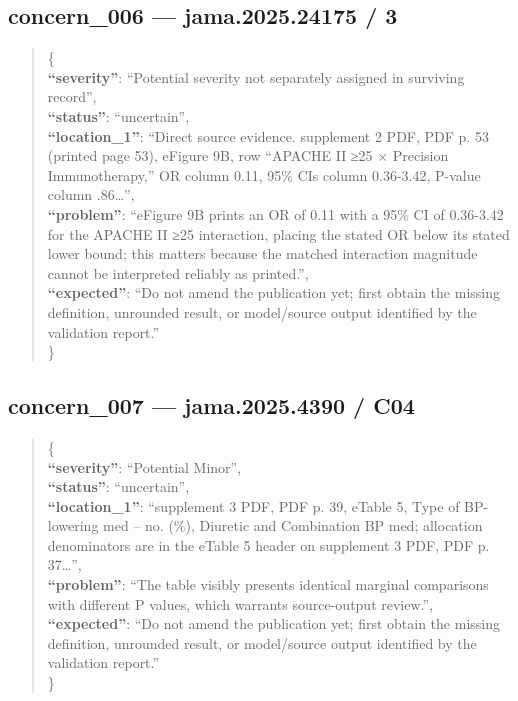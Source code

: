 \documentclass[
  letterpaper,
  9pt]{extreport}
\begin{document}
\hypertarget{concern_006--jama202524175--3}{%
\subsection{concern\_006 --- jama.2025.24175 /
3}\label{concern_006--jama202524175--3}}

\begin{quote}
\{\\
\textbf{``severity''}: ``Potential severity not separately assigned in
surviving record'',\\
\textbf{``status''}: ``uncertain'',\\
\textbf{``location\_1''}: ``Direct source evidence. supplement 2 PDF,
PDF p. 53 (printed page 53), eFigure 9B, row ``APACHE II ≥25 × Precision
Immunotherapy,'' OR column 0.11, 95\% CIs column 0.36-3.42, P-value
column .86\ldots{}'',\\
\textbf{``problem''}: ``eFigure 9B prints an OR of 0.11 with a 95\% CI
of 0.36-3.42 for the APACHE II ≥25 interaction, placing the stated OR
below its stated lower bound; this matters because the matched
interaction magnitude cannot be interpreted reliably as printed.'',\\
\textbf{``expected''}: ``Do not amend the publication yet; first obtain
the missing definition, unrounded result, or model/source output
identified by the validation report.''\\
\}
\end{quote}

\hypertarget{concern_007--jama20254390--c04}{%
\subsection{concern\_007 --- jama.2025.4390 /
C04}\label{concern_007--jama20254390--c04}}

\begin{quote}
\{\\
\textbf{``severity''}: ``Potential Minor'',\\
\textbf{``status''}: ``uncertain'',\\
\textbf{``location\_1''}: ``supplement 3 PDF, PDF p. 39, eTable 5, Type
of BP-lowering med -- no. (\%), Diuretic and Combination BP med;
allocation denominators are in the eTable 5 header on supplement 3 PDF,
PDF p. 37\ldots{}'',\\
\textbf{``problem''}: ``The table visibly presents identical marginal
comparisons with different P values, which warrants source-output
review.'',\\
\textbf{``expected''}: ``Do not amend the publication yet; first obtain
the missing definition, unrounded result, or model/source output
identified by the validation report.''\\
\}
\end{quote}
\end{document}

